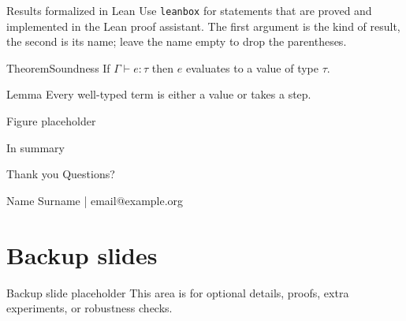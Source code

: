 \documentclass[aspectratio=169,11pt,t]{beamer}
\begin{document}
\begin{frame}{Results formalized in Lean}
  Use \texttt{leanbox} for statements that are proved and implemented in the
  Lean proof assistant. The first argument is the kind of result, the second is
  its name; leave the name empty to drop the parentheses.

  \begin{leanbox}{Theorem}{Soundness}
    If $\Gamma \vdash e : \tau$ then $e$ evaluates to a value of type $\tau$.
  \end{leanbox}

  \begin{leanbox}{Lemma}{}
    Every well-typed term is either a value or takes a step.
  \end{leanbox}
\end{frame}

\begin{frame}[c]{Figure placeholder}
  \begin{center}
  \end{center}
\end{frame}

\begin{frame}{In summary}
  \vfill
  \begin{recap}
  \end{recap}
  \vfill
\end{frame}

\begin{frame}[c]{Thank you}
  \Large Questions?

  \vspace{6mm}
  \normalsize
  \textcolor{IMTMutedText}{Name Surname \quad | \quad email@example.org}
\end{frame}

\appendix
\section*{Backup slides}

\begin{frame}{Backup slide placeholder}
  This area is for optional details, proofs, extra experiments, or robustness checks.
\end{frame}
\end{document}
